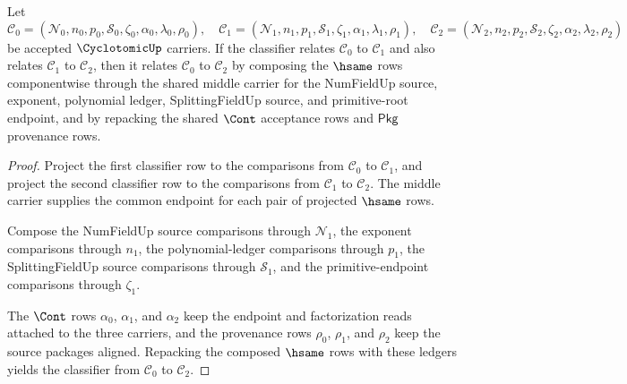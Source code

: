 \begin{theorem}
\label{thm:cyclotomic-classifier-transitive}
Let
$$
\mathcal{C}_{0}=(\mathcal{N}_{0},n_{0},p_{0},\mathcal{S}_{0},\zeta_{0},\alpha_{0},\lambda_{0},\rho_{0}),\quad
\mathcal{C}_{1}=(\mathcal{N}_{1},n_{1},p_{1},\mathcal{S}_{1},\zeta_{1},\alpha_{1},\lambda_{1},\rho_{1}),\quad
\mathcal{C}_{2}=(\mathcal{N}_{2},n_{2},p_{2},\mathcal{S}_{2},\zeta_{2},\alpha_{2},\lambda_{2},\rho_{2})
$$
be accepted $\CyclotomicUp$ carriers. If the classifier relates $\mathcal{C}_{0}$ to $\mathcal{C}_{1}$ and also relates $\mathcal{C}_{1}$ to $\mathcal{C}_{2}$, then it relates $\mathcal{C}_{0}$ to $\mathcal{C}_{2}$ by composing the $\hsame$ rows componentwise through the shared middle carrier for the NumFieldUp source, exponent, polynomial ledger, SplittingFieldUp source, and primitive-root endpoint, and by repacking the shared $\Cont$ acceptance rows and $\mathsf{Pkg}$ provenance rows.
\end{theorem}
\begin{proof}
Project the first classifier row to the comparisons from $\mathcal{C}_{0}$ to $\mathcal{C}_{1}$, and project the second classifier row to the comparisons from $\mathcal{C}_{1}$ to $\mathcal{C}_{2}$. The middle carrier supplies the common endpoint for each pair of projected $\hsame$ rows.

Compose the NumFieldUp source comparisons through $\mathcal{N}_{1}$, the exponent comparisons through $n_{1}$, the polynomial-ledger comparisons through $p_{1}$, the SplittingFieldUp source comparisons through $\mathcal{S}_{1}$, and the primitive-endpoint comparisons through $\zeta_{1}$.

The $\Cont$ rows $\alpha_{0}$, $\alpha_{1}$, and $\alpha_{2}$ keep the endpoint and factorization reads attached to the three carriers, and the provenance rows $\rho_{0}$, $\rho_{1}$, and $\rho_{2}$ keep the source packages aligned. Repacking the composed $\hsame$ rows with these ledgers yields the classifier from $\mathcal{C}_{0}$ to $\mathcal{C}_{2}$.
\end{proof}
